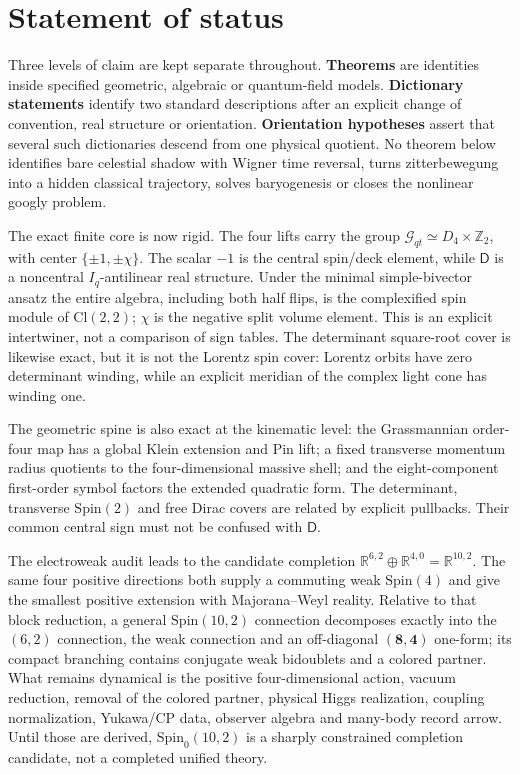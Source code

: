 \documentclass[11pt]{article}
\theoremstyle{definition}\newtheorem{definition}[theorem]{Definition}
\theoremstyle{remark}\newtheorem{remark}[theorem]{Remark}\newtheorem{conjecture}[theorem]{Conjecture}
\begin{document}
\section*{Statement of status}
Three levels of claim are kept separate throughout. \textbf{Theorems} are identities inside specified geometric, algebraic or quantum-field models. \textbf{Dictionary statements} identify two standard descriptions after an explicit change of convention, real structure or orientation. \textbf{Orientation hypotheses} assert that several such dictionaries descend from one physical quotient. No theorem below identifies bare celestial shadow with Wigner time reversal, turns zitterbewegung into a hidden classical trajectory, solves baryogenesis or closes the nonlinear googly problem.

The exact finite core is now rigid. The four lifts carry the group
$\mathcal G_{qt}\simeq D_4\times\mathbb Z_2$, with center
$\{\pm1,\pm\chi\}$. The scalar $-1$ is the central spin/deck element, while $\mathsf D$ is a noncentral $I_q$-antilinear real structure. Under the minimal simple-bivector ansatz the entire algebra, including both half flips, is the complexified spin module of $\mathrm{Cl}(2,2)$; $\chi$ is the negative split volume element. This is an explicit intertwiner, not a comparison of sign tables. The determinant square-root cover is likewise exact, but it is not the Lorentz spin cover: Lorentz orbits have zero determinant winding, while an explicit meridian of the complex light cone has winding one.

The geometric spine is also exact at the kinematic level: the Grassmannian order-four map has a global Klein extension and Pin lift; a fixed transverse momentum radius quotients to the four-dimensional massive shell; and the eight-component first-order symbol factors the extended quadratic form. The determinant, transverse $\mathrm{Spin}(2)$ and free Dirac covers are related by explicit pullbacks. Their common central sign must not be confused with $\mathsf D$.

The electroweak audit leads to the candidate completion
$\mathbb R^{6,2}\oplus\mathbb R^{4,0}=\mathbb R^{10,2}$. The same four positive directions both supply a commuting weak $\mathrm{Spin}(4)$ and give the smallest positive extension with Majorana--Weyl reality. Relative to that block reduction, a general $\mathrm{Spin}(10,2)$ connection decomposes exactly into the $(6,2)$ connection, the weak connection and an off-diagonal $(\mathbf8,\mathbf4)$ one-form; its compact branching contains conjugate weak bidoublets and a colored partner. What remains dynamical is the positive four-dimensional action, vacuum reduction, removal of the colored partner, physical Higgs realization, coupling normalization, Yukawa/CP data, observer algebra and many-body record arrow. Until those are derived, $\mathrm{Spin}_0(10,2)$ is a sharply constrained completion candidate, not a completed unified theory.
\end{document}
